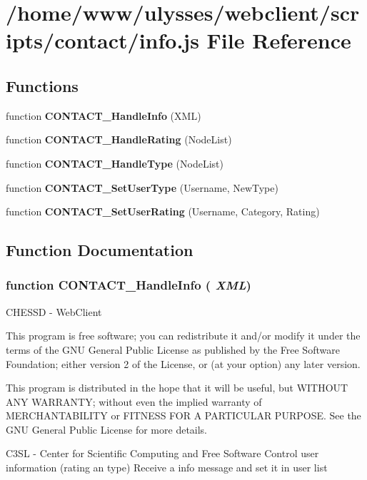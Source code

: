 \section{/home/www/ulysses/webclient/scripts/contact/info.js File Reference}
\label{info_8js}
\subsection*{Functions}
\begin{CompactItemize}
\item 
function {\bf CONTACT\_\-HandleInfo} (XML)
\item 
function {\bf CONTACT\_\-HandleRating} (NodeList)
\item 
function {\bf CONTACT\_\-HandleType} (NodeList)
\item 
function {\bf CONTACT\_\-SetUserType} (Username, NewType)
\item 
function {\bf CONTACT\_\-SetUserRating} (Username, Category, Rating)
\end{CompactItemize}


\subsection{Function Documentation}
\subsubsection{\setlength{\rightskip}{0pt plus 5cm}function CONTACT\_\-HandleInfo ( {\em XML})}\label{info_8js_40fd163b2a7192238e6339e6c353afce}


CHESSD - WebClient

This program is free software; you can redistribute it and/or modify it under the terms of the GNU General Public License as published by the Free Software Foundation; either version 2 of the License, or (at your option) any later version.

This program is distributed in the hope that it will be useful, but WITHOUT ANY WARRANTY; without even the implied warranty of MERCHANTABILITY or FITNESS FOR A PARTICULAR PURPOSE. See the GNU General Public License for more details.

C3SL - Center for Scientific Computing and Free Software Control user information (rating an type) Receive a info message and set it in user list 

